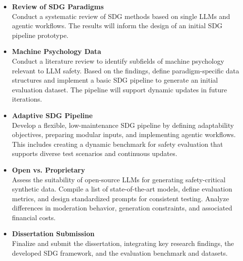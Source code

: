 \documentclass[12pt,a4paper]{article}
\begin{document}
\begin{itemize}
  \item \textbf{Review of SDG Paradigms} \\ 
  Conduct a systematic review of SDG methods based on single LLMs and agentic workflows. The results will inform the design of an initial SDG pipeline prototype.

  \item \textbf{Machine Psychology Data} \\ 
  Conduct a literature review to identify subfields of machine psychology relevant to LLM safety. Based on the findings, define paradigm-specific data structures and implement a basic SDG pipeline to generate an initial evaluation dataset. The pipeline will support dynamic updates in future iterations.

  \item \textbf{Adaptive SDG Pipeline} \\ 
  Develop a flexible, low-maintenance SDG pipeline by defining adaptability objectives, preparing modular inputs, and implementing agentic workflows. This includes creating a dynamic benchmark for safety evaluation that supports diverse test scenarios and continuous updates.


  \item \textbf{Open vs. Proprietary} \\
  Assess the suitability of open-source LLMs for generating safety-critical synthetic data. Compile a list of state-of-the-art models, define evaluation metrics, and design standardized prompts for consistent testing. Analyze differences in moderation behavior, generation constraints, and associated financial costs.

  \item \textbf{Dissertation Submission} \\
  Finalize and submit the dissertation, integrating key research findings, the developed SDG framework, and the evaluation benchmark and datasets.
\end{itemize}






\newpage

\begin{onehalfspacing}
\printbibliography
\end{onehalfspacing}
\end{document}
